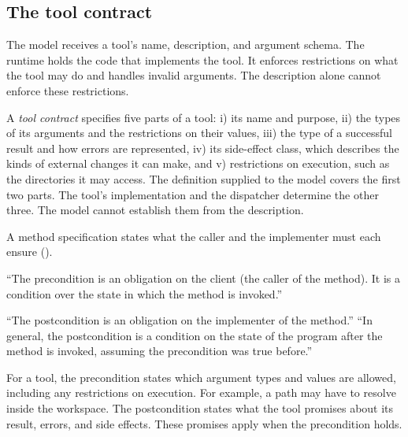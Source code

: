 \subsection{The tool contract}
\label{sec:boundary-contract}

The model receives a tool's name, description, and argument schema. The runtime holds the code
that implements the tool. It enforces restrictions on what the tool may do and handles invalid
arguments. The description alone cannot enforce these restrictions.

\begin{definition}
\label{def:tool-contract}
A \emph{tool contract} specifies five parts of a tool: i) its name and purpose, ii) the types of
its arguments and the restrictions on their values, iii) the type of a successful result and how
errors are represented, iv) its side-effect class, which describes the kinds of external changes
it can make, and v) restrictions on execution, such as the directories it may access. The
definition supplied to the model covers the first two parts. The tool's implementation and the
dispatcher determine the other three. The model cannot establish them from the description.
\end{definition}

A method specification states what the caller and the implementer must each ensure
(\citealp[Specification structure]{mit6031-specs}).

\begin{definition}[Precondition]
\label{def:precondition}
``The precondition is an obligation on the client (the caller of the method). It is a condition over
the state in which the method is invoked.''
\end{definition}

\begin{definition}[Postcondition]
\label{def:postcondition}
``The postcondition is an obligation on the implementer of the method.'' ``In general, the
postcondition is a condition on the state of the program after the method is invoked, assuming the
precondition was true before.''
\end{definition}

For a tool, the precondition states which argument types and values are allowed, including any
restrictions on execution. For example, a path may have to resolve inside the workspace. The
postcondition states what the tool promises about its result, errors, and side effects. These
promises apply when the precondition holds.

